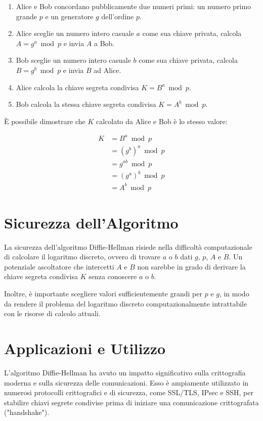 \documentclass[a4paper,12pt]{report}
\begin{document}
\begin{enumerate}
    \item Alice e Bob concordano pubblicamente due numeri primi: un numero primo grande $p$ e un generatore $g$ dell'ordine $p$.
    \item Alice sceglie un numero intero casuale $a$ come sua chiave privata, calcola $A = g^a \bmod p$ e invia $A$ a Bob.
    \item Bob sceglie un numero intero casuale $b$ come sua chiave privata, calcola $B = g^b \bmod p$ e invia $B$ ad Alice.
    \item Alice calcola la chiave segreta condivisa $K = B^a \bmod p$.
    \item Bob calcola la stessa chiave segreta condivisa $K = A^b \bmod p$.
\end{enumerate}

È possibile dimostrare che $K$ calcolato da Alice e Bob è lo stesso valore:

\begin{align*}
K &= B^a \bmod p \\
  &= (g^b)^a \bmod p \\
  &= g^{ab} \bmod p \\
  &= (g^a)^b \bmod p \\
  &= A^b \bmod p
\end{align*}

\section{Sicurezza dell'Algoritmo}
La sicurezza dell'algoritmo Diffie-Hellman risiede nella difficoltà computazionale di calcolare il logaritmo discreto, ovvero di trovare $a$ o $b$ dati $g$, $p$, $A$ e $B$. Un potenziale ascoltatore che intercetti $A$ e $B$ non sarebbe in grado di derivare la chiave segreta condivisa $K$ senza conoscere $a$ o $b$.

Inoltre, è importante scegliere valori sufficientemente grandi per $p$ e $g$, in modo da rendere il problema del logaritmo discreto computazionalmente intrattabile con le risorse di calcolo attuali.

\section{Applicazioni e Utilizzo}
L'algoritmo Diffie-Hellman ha avuto un impatto significativo sulla crittografia moderna e sulla sicurezza delle comunicazioni. Esso è ampiamente utilizzato in numerosi protocolli crittografici e di sicurezza, come SSL/TLS, IPsec e SSH, per stabilire chiavi segrete condivise prima di iniziare una comunicazione crittografata ("handshake").
\end{document}
